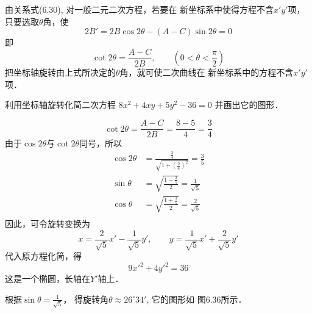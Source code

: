 由关系式(6.30), 对一般二元二次方程，若要在
新坐标系中使得方程不含$x'y'$项，只要选取$\theta$角，使
\[2B'=2B\cos2\theta -(A-C)\sin2\theta=0\]
即
\[\cot 2\theta=\frac{A-C}{2B},\qquad \left(0<\theta<\frac{\pi}{2}\right)\]
把坐标轴旋转由上式所决定的$\theta$角，就可使二次曲线在
新坐标系中的方程不含$x'y'$项．

\begin{example}
    利用坐标轴旋转化简二次方程
$8x^2+4xy+5y^2-36=0$
并画出它的图形．
\end{example}

\begin{solution}
\[\cot 2\theta=\frac{A-C}{2B}=\frac{8-5}{4}=\frac{3}{4}\]
由于$\cos2\theta$与$\cot2\theta$同号，所以
\[\begin{split}
    \cos2\theta&=\frac{\frac{3}{4}}{\sqrt{1+\left(\frac{3}{4}\right)^2}}=\frac{3}{5}\\
    \sin\theta&=\sqrt{\frac{1-\frac{3}{5}}{2}}=\frac{1}{\sqrt{5}}\\
    \cos\theta&=\sqrt{\frac{1+\frac{3}{5}}{2}}=\frac{2}{\sqrt{5}}\\
\end{split}\]
因此，可令旋转变换为
\[x=\frac{2}{\sqrt{5}}x'-\frac{1}{\sqrt{5}}y',\qquad y=\frac{1}{\sqrt{5}}x'+\frac{2}{\sqrt{5}}y'\]
代入原方程化简，得
\[9{x'}^2+4{y'}^2=36\]
这是一个椭圆，长轴在$Y'$轴上．

根据$\sin\theta=\frac{1}{\sqrt{5}}$，
得旋转角$\theta\approx 26^{\circ}34'$, 它的图形如
图6.36所示．
\end{solution}

\begin{figure}[htp]
    \centering
    \caption{}
\end{figure}

